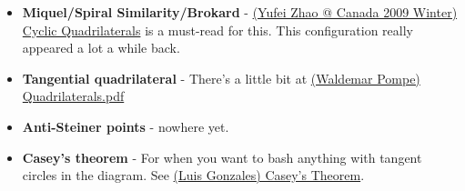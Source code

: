 	\begin{itemize}
	\item \textbf{Miquel/Spiral Similarity/Brokard} - \href{run:./F_geometry/(Yufei Zhao @ Canada 2009 Winter) Cyclic Quadrilaterals.pdf}{(Yufei Zhao @ Canada 2009 Winter) Cyclic Quadrilaterals} is a must-read for this. This configuration really appeared a lot a while back.
	\item \textbf{Tangential quadrilateral} - There's a little bit at \href{run:./F_Geometry/(Waldemar Pompe) Quadrilaterals.pdf}{(Waldemar Pompe) Quadrilaterals.pdf}
	\item \textbf{Anti-Steiner points} - nowhere yet.
	\item \textbf{Casey's theorem} - For when you want to bash anything with tangent circles in the diagram. See \href{run:./F_Geometry/(Luis Gonzales) Casey's Theorem.pdf}{(Luis Gonzales) Casey's Theorem}.
	\end{itemize}
